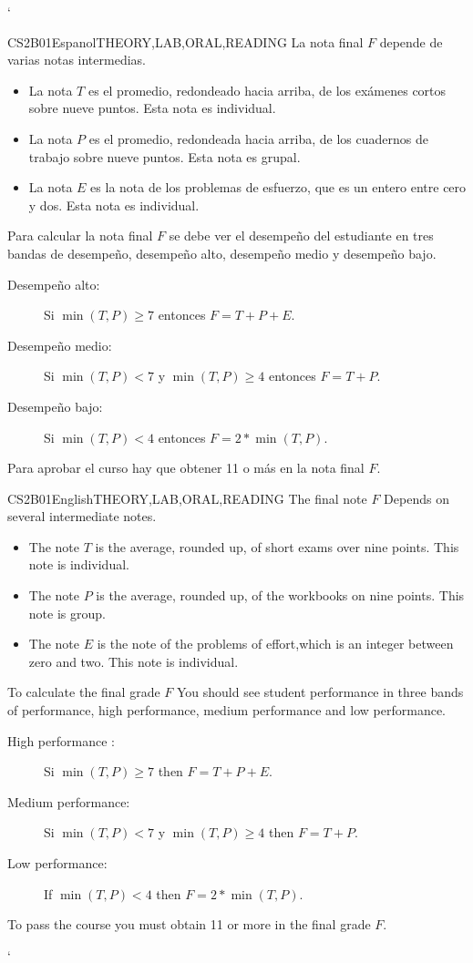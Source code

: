 `\begin{evaluation}{CS2B01}{Espanol}{THEORY,LAB,ORAL,READING}
La nota final $F$ depende de varias notas intermedias.
	\begin{itemize}
		\item La nota $T$ es el promedio, redondeado hacia arriba, de los exámenes cortos sobre nueve puntos. Esta nota es individual.
		\item La nota $P$ es el promedio, redondeada hacia arriba, de los cuadernos de trabajo sobre nueve puntos. Esta nota es grupal.
		\item La nota $E$ es la nota de los problemas de esfuerzo, que es un entero entre cero y dos. Esta nota es individual.
	\end{itemize}

	Para calcular la nota final $F$ se debe ver el desempeño del estudiante en tres bandas de desempeño, desempeño alto, desempeño medio y desempeño bajo.
	\begin{description}
		\item[Desempeño alto:] Si $\min(T,P)\geq 7$ entonces $F=T+P+E$.
		\item[Desempeño medio:] Si $\min(T,P)<7$ y $\min(T,P)\geq4$ entonces $F=T+P$.
		\item[Desempeño bajo:] Si $\min(T,P)<4$ entonces $F=2*\min(T,P)$.
	\end{description}

	Para aprobar el curso hay que obtener 11 o más en la nota final $F$.
\end{evaluation}

\begin{evaluation}{CS2B01}{English}{THEORY,LAB,ORAL,READING}
The final note $F$ Depends on several intermediate notes.
	\begin{itemize}
		\item The note $T$ is the average, rounded up, of short exams over nine points. This note is individual.
		\item The note $P$ is the average, rounded up, of the workbooks on nine points. This note is group.
		\item The note $E$ is the note of the problems of effort,which is an integer between zero and two. This note is individual.
	\end{itemize}

	To calculate the final grade $F$ You should see student performance in three bands of performance, high performance, medium performance and low performance.
	\begin{description}
		\item[High performance :] Si $\min(T,P)\geq 7$ then $F=T+P+E$.
		\item[Medium performance:] Si $\min(T,P)<7$ y $\min(T,P)\geq4$ then $F=T+P$.
		\item[Low performance:] If $\min(T,P)<4$ then $F=2*\min(T,P)$.
	\end{description}

	To pass the course you must obtain 11 or more in the final grade $F$.
\end{evaluation}`
